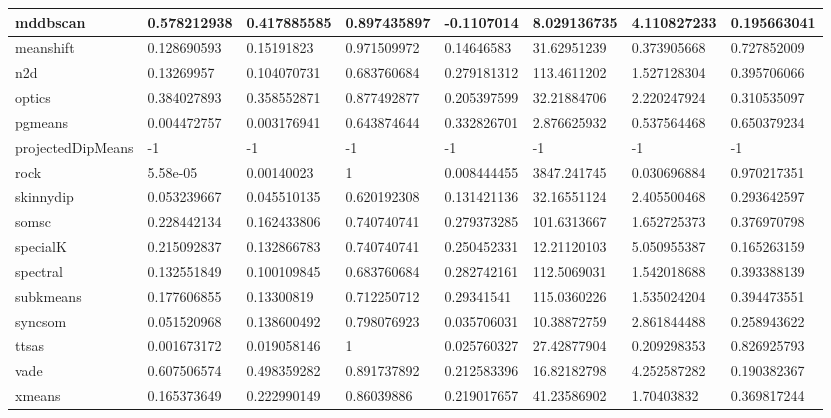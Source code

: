 \begin{table}[H]
\begin{tabular}{|l|l|l|l|l|l|l|l|}
\hline
mddbscan & 0.578212938 & 0.417885585 & 0.897435897 & -0.1107014 & 8.029136735 & 4.110827233 & 0.195663041 \\
\hline
meanshift & 0.128690593 & 0.15191823 & 0.971509972 & 0.14646583 & 31.62951239 & 0.373905668 & 0.727852009 \\
\hline
n2d & 0.13269957 & 0.104070731 & 0.683760684 & 0.279181312 & 113.4611202 & 1.527128304 & 0.395706066 \\
\hline
optics & 0.384027893 & 0.358552871 & 0.877492877 & 0.205397599 & 32.21884706 & 2.220247924 & 0.310535097 \\
\hline
pgmeans & 0.004472757 & 0.003176941 & 0.643874644 & 0.332826701 & 2.876625932 & 0.537564468 & 0.650379234 \\
\hline
projectedDipMeans & -1 & -1 & -1 & -1 & -1 & -1 & -1 \\
\hline
rock & 5.58e-05 & 0.00140023 & 1 & 0.008444455 & 3847.241745 & 0.030696884 & 0.970217351 \\
\hline
skinnydip & 0.053239667 & 0.045510135 & 0.620192308 & 0.131421136 & 32.16551124 & 2.405500468 & 0.293642597 \\
\hline
somsc & 0.228442134 & 0.162433806 & 0.740740741 & 0.279373285 & 101.6313667 & 1.652725373 & 0.376970798 \\
\hline
specialK & 0.215092837 & 0.132866783 & 0.740740741 & 0.250452331 & 12.21120103 & 5.050955387 & 0.165263159 \\
\hline
spectral & 0.132551849 & 0.100109845 & 0.683760684 & 0.282742161 & 112.5069031 & 1.542018688 & 0.393388139 \\
\hline
subkmeans & 0.177606855 & 0.13300819 & 0.712250712 & 0.29341541 & 115.0360226 & 1.535024204 & 0.394473551 \\
\hline
syncsom & 0.051520968 & 0.138600492 & 0.798076923 & 0.035706031 & 10.38872759 & 2.861844488 & 0.258943622 \\
\hline
ttsas & 0.001673172 & 0.019058146 & 1 & 0.025760327 & 27.42877904 & 0.209298353 & 0.826925793 \\
\hline
vade & 0.607506574 & 0.498359282 & 0.891737892 & 0.212583396 & 16.82182798 & 4.252587282 & 0.190382367 \\
\hline
xmeans & 0.165373649 & 0.222990149 & 0.86039886 & 0.219017657 & 41.23586902 & 1.70403832 & 0.369817244 \\
\hline
\end{tabular}
\end{table}